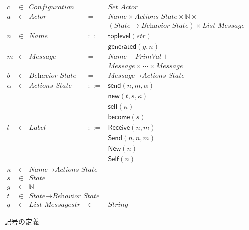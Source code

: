 \begin{figure}[t]
  \begin{displaymath}
    \begin{array}{rclcl}
      c & \in & \textit{Configuration} & =   & \textit{Set Actor} \\
      a & \in & \textit{Actor}  & =   & \textit{Name} \times \textit{Actions State} \times \mathbb{N} \times \\
        &     &                 &     & (\textit{State} \rightarrow \textit{Behavior State}) \times \textit{List Message} \\
      n & \in & \textit{Name}   & ::= & \textsf{toplevel}(str) \\
        &     &                 &   | & \textsf{generated}(g, n) \\
      m & \in & \textit{Message} & =  & \textit{Name} + \textit{PrimVal} + \\
        &     &                 &     & \textit{Message} \times \cdots \times \textit{Message} \\
      b & \in & \textit{Behavior State} & = & \textit{Message} \rightarrow \textit{Actions State} \\
      \alpha & \in & \textit{Actions State} & ::= & \textsf{send}(n, m, \alpha) \\
        &     &                 &   | & \textsf{new}(t, s, \kappa) \\
        &     &                 &   | & \textsf{self}(\kappa) \\
        &     &                 &   | & \textsf{become}(s) \\
      l & \in & \textit{Label}  & ::= & \textsf{Receive}(n, m) \\
        &     &                 &   | & \textsf{Send}(n, n, m) \\
        &     &                 &   | & \textsf{New}(n) \\
        &     &                 &   | & \textsf{Self}(n) \\
      \kappa & \in & \textit{Name} \rightarrow \textit{Actions State} \\
      s & \in & \textit{State} & & \\
      g & \in & \mathbb{N} & & \\
      t & \in & \textit{State} \rightarrow \textit{Behavior State} \\
      q & \in & \textit{List Message}
      str & \in & \textit{String}
    \end{array}
  \end{displaymath}
  \caption{記号の定義}\label{expr:formalization:config}
\end{figure}


